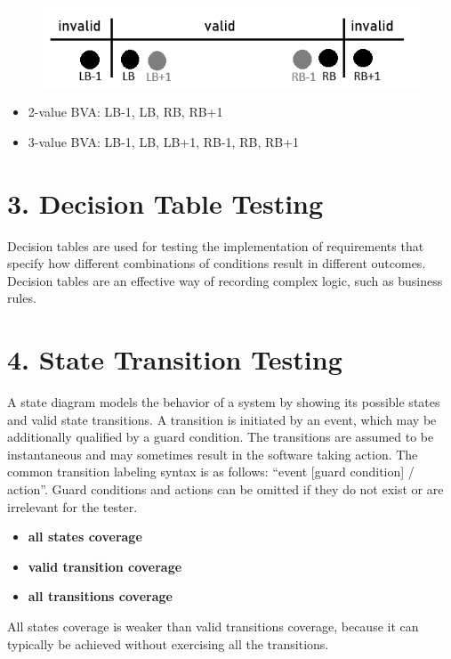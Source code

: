 \documentclass{article}
\begin{document}
\begin{multicols}{3}
{\vspace{-10pt}
\begin{figure}[H]
    \includegraphics[width=1\textwidth]{images/bva.png}
    \vspace{-10pt}
\end{figure}
    
\begin{itemize}
\item 2-value BVA: LB-1, LB, RB, RB+1
\item 3-value BVA: LB-1, LB, LB+1, RB-1, RB, RB+1
\end{itemize}

\section*{3. Decision Table Testing}
Decision tables are used for testing the implementation of requirements that specify how different combinations of conditions result in different outcomes. Decision tables are an effective way of recording complex logic, such as business rules.\\

\section*{4. State Transition Testing}
A state diagram models the behavior of a system by showing its possible states and valid state transitions. A transition is initiated by an event, which may be additionally qualified by a guard condition. The transitions are assumed to be instantaneous and may sometimes result in the software taking action. The common transition labeling syntax is as follows: “event [guard condition] / action”. Guard conditions and actions can be omitted if they do not exist or are irrelevant for the tester.
\begin{itemize}
\item \textbf{all states coverage}
\item \textbf{valid transition coverage}
\item \textbf{all transitions coverage}
\end{itemize}
All states coverage is weaker than valid transitions coverage, because it can typically be achieved without exercising all the transitions.\\


}
\end{multicols}
\end{document}
